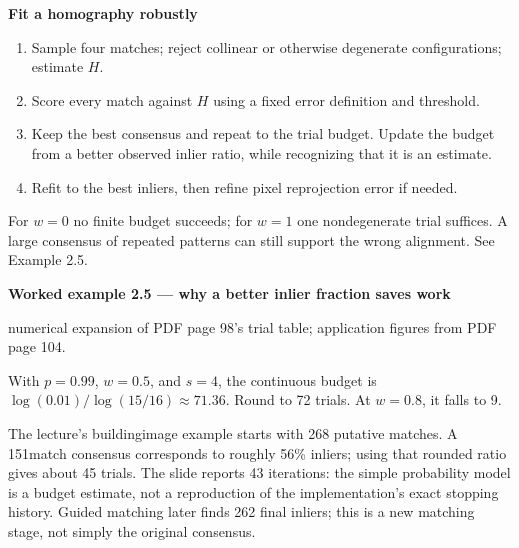 \documentclass[letterpaper,11pt,english,openany,oneside]{jupyterBook}
\begin{document}
\begin{TextbookBox}
\textbf{Fit a homography robustly}\par\smallskip
\begin{enumerate}
%
\item {}
\sphinxAtStartPar
Sample four matches; reject collinear or otherwise degenerate configurations; estimate \(H\).

\item {}
\sphinxAtStartPar
Score every match against \(H\) using a fixed error definition and threshold.

\item {}
\sphinxAtStartPar
Keep the best consensus and repeat to the trial budget. Update the budget from a better observed inlier ratio, while recognizing that it is an estimate.

\item {}
\sphinxAtStartPar
Refit to the best inliers, then refine pixel reprojection error if needed.

\end{enumerate}

\sphinxAtStartPar
For \(w=0\) no finite budget succeeds; for \(w=1\) one nondegenerate trial suffices. A large consensus of repeated patterns can still support the wrong alignment. See Example 2.5.

\end{TextbookBox}
\label{\detokenize{lectures/lecture02/estimation:ex-lec02-ransac}}
\begin{TextbookBox}
\textbf{Worked example 2.5 — why a better inlier fraction saves work}\par\smallskip

\sphinxAtStartPar
{} numerical expansion of PDF page 98’s trial table; application figures from PDF page 104.

\sphinxAtStartPar
With \(p=0.99\), \(w=0.5\), and \(s=4\), the continuous budget is \(\log(0.01)/\log(15/16)\approx71.36\). Round  to 72 trials. At \(w=0.8\), it falls to 9.

\sphinxAtStartPar
The lecture’s building\sphinxhyphen{}image example starts with 268 putative matches. A 151\sphinxhyphen{}match consensus corresponds to roughly 56\% inliers; using that rounded ratio gives about 45 trials. The slide reports 43 iterations: the simple probability model is a budget estimate, not a reproduction of the implementation’s exact stopping history. Guided matching later finds 262 final inliers; this is a new matching stage, not simply the original consensus.

\end{TextbookBox}
\end{document}
